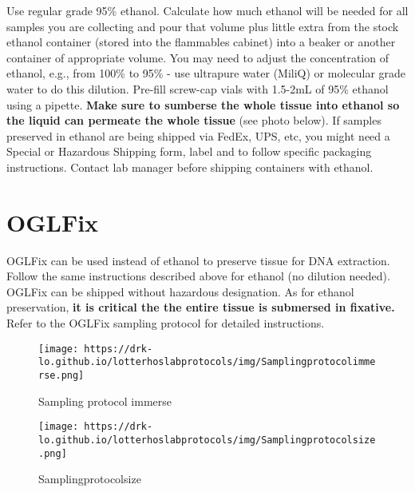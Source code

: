 \documentclass[
  letterpaper,
  DIV=11,
  numbers=noendperiod]{scrreprt}
\begin{document}

Use regular grade 95\% ethanol. Calculate how much ethanol will be
needed for all samples you are collecting and pour that volume plus
little extra from the stock ethanol container (stored into the
flammables cabinet) into a beaker or another container of appropriate
volume. You may need to adjust the concentration of ethanol, e.g., from
100\% to 95\% - use ultrapure water (MiliQ) or molecular grade water to
do this dilution. Pre-fill screw-cap vials with 1.5-2mL of 95\% ethanol
using a pipette. \textbf{Make sure to sumberse the whole tissue into
ethanol so the liquid can permeate the whole tissue} (see photo below).
If samples preserved in ethanol are being shipped via FedEx, UPS, etc,
you might need a Special or Hazardous Shipping form, label and to follow
specific packaging instructions. Contact lab manager before shipping
containers with ethanol.

\hypertarget{oglfix}{%
\section*{\texorpdfstring{\textbf{OGLFix}}{OGLFix}}\label{oglfix}}


OGLFix can be used instead of ethanol to preserve tissue for DNA
extraction. Follow the same instructions described above for ethanol (no
dilution needed). OGLFix can be shipped without hazardous designation.
As for ethanol preservation, \textbf{it is critical the the entire
tissue is submersed in fixative.} Refer to the OGLFix sampling protocol
for detailed instructions.

\begin{figure}

{\centering \texttt{[image: https://drk-lo.github.io/lotterhoslabprotocols/img/Samplingprotocolimmerse.png]}

}

\caption{Sampling protocol immerse}

\end{figure}

\begin{figure}

{\centering \texttt{[image: https://drk-lo.github.io/lotterhoslabprotocols/img/Samplingprotocolsize.png]}

}

\caption{Samplingprotocolsize}

\end{figure}
\end{document}
